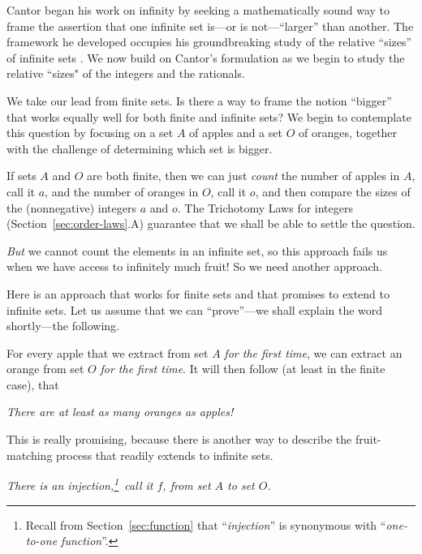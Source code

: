 \medskip

Cantor began his work on infinity by seeking a mathematically sound way to frame the assertion that one infinite set is---or is not---``larger'' than another.  The framework he developed occupies his groundbreaking study of the relative ``sizes'' of infinite sets \cite{Cantor74,Cantor78}.  We now build on Cantor's formulation as we begin to study the relative ``sizes" of the integers and the rationals.

\medskip

We take our lead from finite sets.  Is there a way to frame the notion ``bigger'' that works equally well for both finite and infinite sets?  We begin to contemplate this question by focusing on a set $A$ of apples and a set $O$ of oranges, together with the challenge of determining which set is bigger.

\medskip

If sets $A$ and $O$ are both finite, then we can just {\em count} the number of apples in $A$, call it $a$, and the number of oranges in $O$, call it $o$, and then compare the sizes of the (nonnegative) integers $a$ and $o$.  The Trichotomy Laws for integers 
(Section~\ref{sec:order-laws}.A) guarantee that we shall be able to settle the question.

\smallskip

\noindent
{\em But} we cannot count the elements in an infinite set, so this approach fails us when we have access to infinitely much fruit!  So we need another approach.

\medskip

Here is an approach that works for finite sets and that promises to extend to infinite sets.  Let us assume that we can ``prove''---we shall explain the word shortly---the following.

\smallskip

For every apple that we extract from set $A$ {\em for the first time}, we can extract an orange from set $O$ {\em for the first time}.  It will then follow (at least in the finite case), that

{\em There are at least as many oranges as apples!}

\medskip

\noindent
This is really promising, because there is another way to describe the fruit-matching process that readily extends to infinite sets.

{\em There is an injection,\footnote{Recall from Section~\ref{sec:function} that ``{\em injection}'' is synonymous with ``{\em one-to-one function}''.}~call it $f$, from set $A$ to set $O$.}

